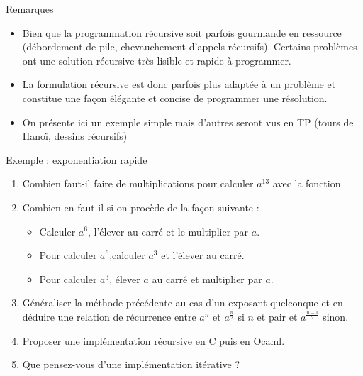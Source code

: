 \documentclass[10pt]{beamer}
\begin{document}
\begin{frame}[fragile]{\Ctitle}{\stitle}
	\begin{block}{Remarques}
		\begin{itemize}
			\item<1->Bien que la programmation récursive soit parfois gourmande en ressource (débordement de pile, chevauchement d'appels récursifs). Certains problèmes ont une solution récursive très lisible et rapide à programmer.
			\item<2-> La formulation récursive est donc parfois \og plus adaptée \fg{} à un problème et constitue une façon élégante et concise de programmer une résolution.
			\item<3-> On présente ici un exemple simple mais d'autres seront vus en TP (tours de Hanoï, dessins récursifs)
		\end{itemize}
	\end{block}
\end{frame}

\begin{frame}[fragile]{\Ctitle}{\stitle}
	\begin{exampleblock}{Exemple : exponentiation rapide}
		\begin{enumerate}
			\item<1-> Combien faut-il faire de multiplications pour calculer $a^{13}$ avec la fonction
			\item<2-> Combien en faut-il si on procède de la façon suivante :
				\begin{itemize}
					\item<3-> Calculer $a^6$, l'élever au carré et le multiplier par $a$.
					\item<4-> Pour calculer $a^6$,calculer $a^3$ et l'élever au carré.
					\item<5-> Pour calculer $a^3$, élever $a$ au carré et multiplier par $a$.
				\end{itemize}
			\item<6-> Généraliser la méthode précédente au cas d'un exposant quelconque et en déduire une relation de récurrence entre $a^n$ et $a^\frac{n}{2}$ si $n$ et pair et $a^\frac{n-1}{2}$ sinon.
			\item<7-> Proposer une implémentation récursive en C puis en Ocaml.
			\item<8-> Que pensez-vous d'une implémentation itérative ?
		\end{enumerate}
	\end{exampleblock}
\end{frame}
\end{document}

